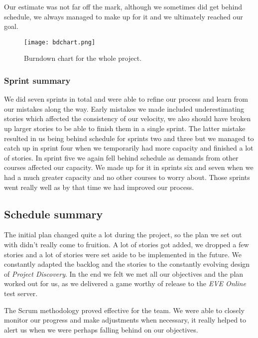     Our estimate was not far off the mark, although we sometimes did get behind schedule, we always managed to make up for it and we ultimately reached our goal. 
		
		\begin{figure}[H]
		  \centering
		  \graphicspath{ {./graphics/} }
		  \centerline{\texttt{[image: bdchart.png]}}
		  \caption{\label{fig:bdchart} Burndown chart for the whole project.}
		\end{figure}

	\subsubsection{Sprint summary}
  We did seven sprints in total and were able to refine our process and learn from our mistakes along the way. Early mistakes we made included underestimating stories which affected the consistency of our velocity, we also should have broken up larger stories to be able to finish them in a single sprint. The latter mistake resulted in us being behind schedule for sprints two and three but we managed to catch up in sprint four when we temporarily had more capacity and finished a lot of stories. In sprint five we again fell behind schedule as demands from other courses affected our capacity. We made up for it in sprints six and seven when we had a much greater capacity and no other courses to worry about. Those sprints went really well as by that time we had improved our process. 

\subsection{Schedule summary}
The initial plan changed quite a lot during the project, so the plan we set out with didn't really come to fruition. A lot of stories got added, we dropped a few stories and a lot of stories were set aside to be implemented in the future. We constantly adapted the backlog and the stories to the constantly evolving design of \emph{Project Discovery}. In the end we felt we met all our objectives and the plan worked out for us, as we delivered a game worthy of release to the \emph{EVE Online} test server. 

The Scrum methodology proved effective for the team. We were able to closely monitor our progress and make adjustments when necessary, it really helped to alert us when we were perhaps falling behind on our objectives.